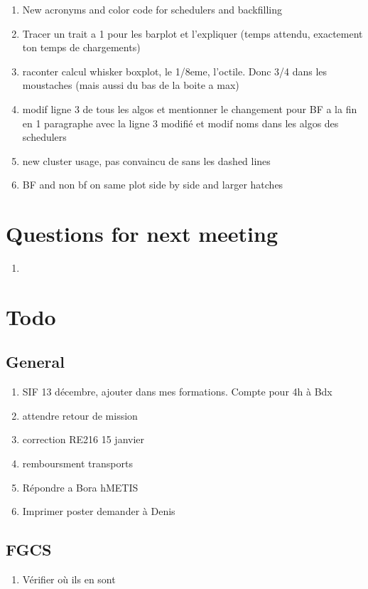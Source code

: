 \documentclass[a4paper]{article}
\begin{document}
\begin{enumerate}
		\item New acronyms and color code for schedulers and backfilling
		\item Tracer un trait a 1 pour les barplot et l'expliquer (temps attendu, exactement ton temps de chargements)
		\item raconter calcul whisker boxplot, le 1/8eme, l'octile. Donc 3/4 dans les moustaches (mais aussi du bas de la boite a max)
		\item modif ligne 3 de tous les algos et mentionner le changement pour BF a la fin en 1 paragraphe avec la ligne 3 modifié et modif noms dans les algos des schedulers
		\item new cluster usage, pas convaincu de sans les dashed lines
		\item BF and non bf on same plot side by side and larger hatches
	\end{enumerate}
	
\section{Questions for next meeting}
	\begin{enumerate}
		\item
	\end{enumerate}
	
\section{Todo}
	\subsection{General}
		\begin{enumerate}
			\item SIF 13 décembre, ajouter dans mes formations. Compte pour 4h à Bdx
			\item attendre retour de mission
			\item correction RE216 15 janvier
			\item remboursment transports
			\item Répondre a Bora hMETIS
			\item Imprimer poster demander à Denis
		\end{enumerate}
	\subsection{FGCS}
		\begin{enumerate}
			\item Vérifier où ils en sont
		\end{enumerate}
\end{document}
